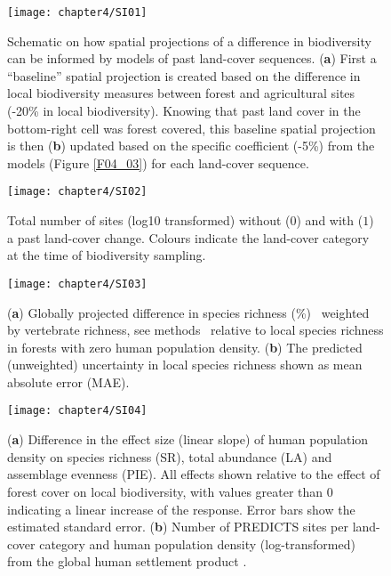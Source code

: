 \begin{figure}[htb]
\centering
\texttt{[image: chapter4/SI01]}
\caption{ Schematic on how spatial projections of a difference in biodiversity can be informed by models of past land-cover sequences. (\textbf{a}) First a “baseline” spatial projection is created based on the difference in local biodiversity measures between forest and agricultural sites (-20\% in local biodiversity). Knowing that past land cover in the bottom-right cell was forest covered, this baseline spatial projection is then (\textbf{b}) updated based on the specific coefficient (-5\%) from the models (Figure \ref{F04_03}) for each land-cover sequence. }
\label{SI04_01}
\end{figure}

\begin{figure}[htb]
\centering
\texttt{[image: chapter4/SI02]}
\caption{ Total number of sites (log10 transformed) without ($0$) and with ($1$) a past land-cover change. Colours indicate the land-cover category at the time of biodiversity sampling. }
\label{SI04_02}
\end{figure}

\begin{figure}[htb]
\centering
\texttt{[image: chapter4/SI03]}
\caption{ (\textbf{a}) Globally projected difference in species richness (\%) \textendash\ weighted by vertebrate richness, see methods \textendash\ relative to local species richness in forests with zero human population density. (\textbf{b}) The predicted (unweighted) uncertainty in local species richness shown as mean absolute error (MAE). }
\label{SI04_03}
\end{figure}

\begin{figure}[htb]
\centering
\texttt{[image: chapter4/SI04]}
\caption{ (\textbf{a}) Difference in the effect size (linear slope) of human population density on species richness (SR), total abundance (LA) and assemblage evenness (PIE). All effects shown relative to the effect of forest cover on local biodiversity, with values greater than $0$ indicating a linear increase of the response. Error bars show the estimated standard error. (\textbf{b}) Number of PREDICTS sites per land-cover category and human population density (log-transformed) from the global human settlement product \citep{Pesaresi2016}. }
\label{SI04_04}
\end{figure}


